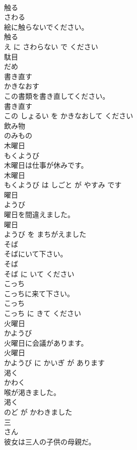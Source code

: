\documentclass[8pt]{extreport}
\begin{document}
\begin{CJK}{UTF8}{min}
\\	触る	
\\	さわる			
\\	絵に触らないでください。	
\\	触る 
\\	え に さわらない で ください			
\\	駄目	
\\	だめ			
\\	書き直す	
\\	かきなおす			
\\	この書類を書き直してください。	
\\	書き直す 
\\	この しょるい を かきなおして ください			
\\	飲み物	
\\	のみもの			
\\	木曜日	
\\	もくようび			
\\	木曜日は仕事が休みです。	
\\	木曜日 
\\	もくようび は しごと が やすみ です			
\\	曜日	
\\	ようび			
\\	曜日を間違えました。	
\\	曜日 
\\	ようび を まちがえました			
\\	そば	
\\	そばにいて下さい。	
\\	そば 
\\	そば に いて ください			
\\	こっち	
\\	こっちに来て下さい。	
\\	こっち 
\\	こっち に きて ください			
\\	火曜日	
\\	かようび			
\\	火曜日に会議があります。	
\\	火曜日 
\\	かようび に かいぎ が あります			
\\	渇く	
\\	かわく			
\\	喉が渇きました。	
\\	渇く 
\\	のど が かわきました			
\\	三	
\\	さん			
\\	彼女は三人の子供の母親だ。	

\end{CJK}
\end{document}
